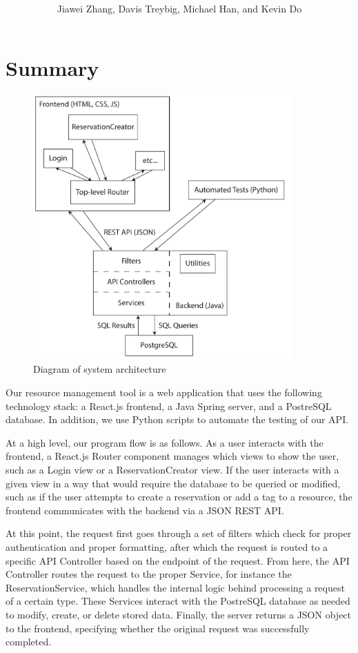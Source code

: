 \documentclass[12pt]{article}
\title{\horrule{5pt}\\\vspace{0.4cm}{\bf \mytitle}\\}
\author{Jiawei Zhang, Davis Treybig, Michael Han, and Kevin Do}
\date{\horrule{1pt}}
\begin{document}
\maketitle{}
\section{Summary}
\begin{figure}[h]
\begin{center}
\includegraphics[height=4in]{design_cropped.pdf}
\end{center}
\caption{Diagram of system architecture}
\label{fig:design}
\end{figure}

Our resource management tool is a web application that uses the following technology stack: a React.js frontend, a Java Spring server, and a PostreSQL database. In addition, we use Python scripts to automate the testing of our API. 

At a high level, our program flow is as follows. As a user interacts with the frontend, a React.js Router component manages which views to show the user, such as a Login view or a ReservationCreator view. If the user interacts with a given view in a way that would require the database to be queried or modified, such as if the user attempts to create a reservation or add a tag to a resource, the frontend communicates with the backend via a JSON REST API. 

At this point, the request first goes through a set of filters which check for proper authentication and proper formatting, after which the request is routed to a specific API Controller based on the endpoint of the request. From here, the API Controller routes the request to the proper Service, for instance the ReservationService, which handles the internal logic behind processing a request of a certain type. These Services interact with the PostreSQL database as needed to modify, create, or delete stored data. Finally, the server returns a JSON object to the frontend, specifying whether the original request was successfully completed. 
    
\end{document}
